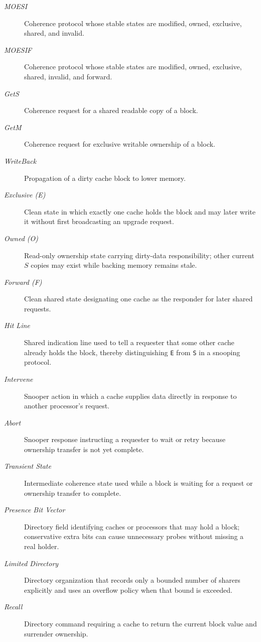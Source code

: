 \begin{description}
    \item[\textit{MOESI}] Coherence protocol whose stable states are modified, owned, exclusive, shared, and invalid.
    \item[\textit{MOESIF}] Coherence protocol whose stable states are modified, owned, exclusive, shared, invalid, and forward.
    \item[\textit{GetS}] Coherence request for a shared readable copy of a block.
    \item[\textit{GetM}] Coherence request for exclusive writable ownership of a block.
    \item[\textit{WriteBack}] Propagation of a dirty cache block to lower memory.
    \item[\textit{Exclusive (E)}] Clean state in which exactly one cache holds the block and may later write it without first broadcasting an upgrade request.
    \item[\textit{Owned (O)}] Read-only ownership state carrying dirty-data responsibility; other current $S$ copies may exist while backing memory remains stale.
    \item[\textit{Forward (F)}] Clean shared state designating one cache as the responder for later shared requests.
    \item[\textit{Hit Line}] Shared indication line used to tell a requester that some other cache already holds the block, thereby distinguishing \texttt{E} from \texttt{S} in a snooping protocol.
    \item[\textit{Intervene}] Snooper action in which a cache supplies data directly in response to another processor's request.
    \item[\textit{Abort}] Snooper response instructing a requester to wait or retry because ownership transfer is not yet complete.
    \item[\textit{Transient State}] Intermediate coherence state used while a block is waiting for a request or ownership transfer to complete.
    \item[\textit{Presence Bit Vector}] Directory field identifying caches or processors that may hold a block; conservative extra bits can cause unnecessary probes without missing a real holder.
    \item[\textit{Limited Directory}] Directory organization that records only a bounded number of sharers explicitly and uses an overflow policy when that bound is exceeded.
    \item[\textit{Recall}] Directory command requiring a cache to return the current block value and surrender ownership.

\end{description}
